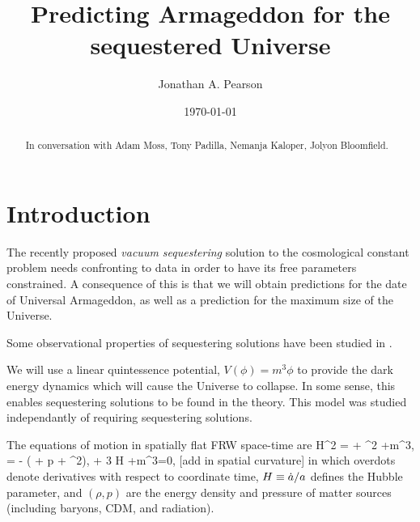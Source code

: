 \documentclass[amsmath,amssymb,10pt,twocolumn,eqsecnum]{revtex4}
\newcommand{\comment}[1]{{\color{red}[#1]}}
\newcommand{\Mpsq}[0]{{\qsubrm{M}{pl}^2}}
\begin{document}
 

\title{Predicting Armageddon for the sequestered Universe}
\author{Jonathan A. Pearson}

\date{\today}


\begin{abstract} 
In conversation with Adam Moss, Tony Padilla, Nemanja Kaloper, Jolyon Bloomfield.

\end{abstract}

\maketitle
\tableofcontents
\section{Introduction}
The recently proposed \textit{vacuum sequestering} solution to the cosmological constant problem \cite{Kaloper:2013zca, Kaloper:2014dqa, Kaloper:2014fca} needs confronting to data in order to have its free parameters constrained. A consequence of this is that we will obtain predictions for the date of  Universal Armageddon, as well as a prediction for the maximum size of the Universe.

Some observational properties of sequestering solutions have been studied in \cite{Avelino:2014nqa, Avelino:2014aea, Kluson:2014tma}.

We will use a linear quintessence potential, $V(\phi) =  {m}^3\phi$ to provide the dark energy dynamics which will cause the Universe to collapse. In some sense, this enables sequestering solutions to be found in the theory. This model was studied \cite{Kallosh:2003bq} independantly of requiring sequestering solutions.

The equations of motion in spatially flat FRW space-time  are
\bse
\label{frw-eqnsofmotion}
\bea
3\Mpsq H^2 =  {\rho}{ } + \half \dot{\phi}^2 +m^3\phi,
\eea
\bea
3\Mpsq {} = - \left(  {\rho}{ } +  {p}{ } + \dot{\phi}^2\right),
\eea
\bea
\ddot{\phi} + 3 H \dot{\phi} +m^3=0,
\eea
\ese
\comment{add in spatial curvature}
in which overdots denote derivatives with respect to coordinate time, $H \equiv \dot{a}/a$ defines the Hubble parameter, and $(\rho, p)$ are the energy density and pressure of matter sources (including baryons, CDM, and radiation).
\end{document}
